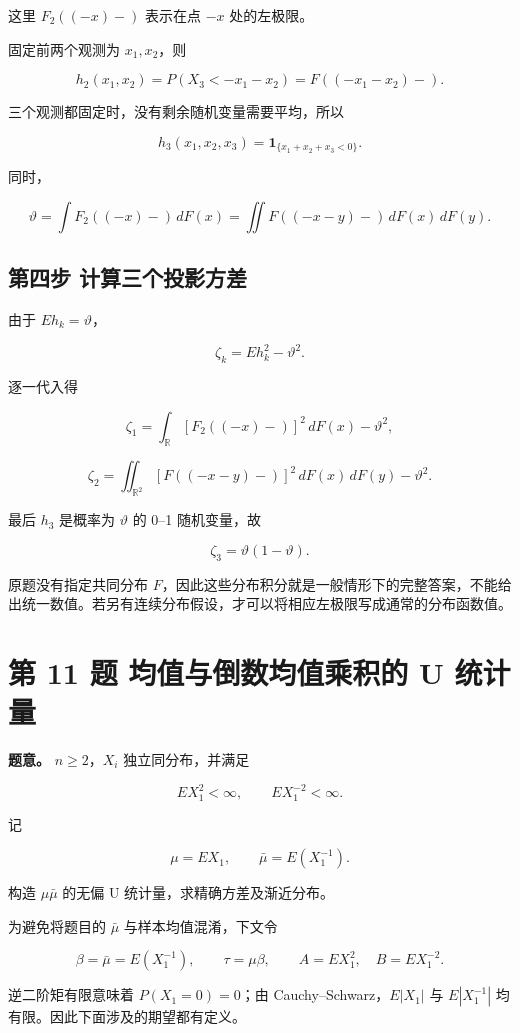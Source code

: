 这里 $F_2((-x)-)$ 表示在点 $-x$ 处的左极限。

固定前两个观测为 $x_1,x_2$，则

\[
h_2(x_1,x_2)
=P(X_3<-x_1-x_2)
=\boxed{F((-x_1-x_2)-)}.
\]

三个观测都固定时，没有剩余随机变量需要平均，所以

\[
\boxed{h_3(x_1,x_2,x_3)
=\mathbf1_{\{x_1+x_2+x_3<0\}}.}
\]

同时，

\[
\vartheta=\int F_2((-x)-)\,dF(x)
=\iint F((-x-y)-)\,dF(x)\,dF(y).
\]

\subsection{第四步 计算三个投影方差}

由于 $E h_k=\vartheta$，

\[
\zeta_k=E h_k^2-\vartheta^2.
\]

逐一代入得

\[
\boxed{
\zeta_1=\int_{\mathbb R}
[F_2((-x)-)]^2\,dF(x)-\vartheta^2,}
\]

\[
\boxed{
\zeta_2=\iint_{\mathbb R^2}
[F((-x-y)-)]^2\,dF(x)\,dF(y)-\vartheta^2.}
\]

最后 $h_3$ 是概率为 $\vartheta$ 的 0--1 随机变量，故

\[
\boxed{\zeta_3=\vartheta(1-\vartheta).}
\]

原题没有指定共同分布 $F$，因此这些分布积分就是一般情形下的完整答案，不能给出统一数值。若另有连续分布假设，才可以将相应左极限写成通常的分布函数值。

\section{第 11 题 均值与倒数均值乘积的 U 统计量}

\textbf{题意。} $n\ge2$，$X_i$ 独立同分布，并满足

\[
E X_1^2<\infty,\qquad E X_1^{-2}<\infty.
\]

记

\[
\mu=E X_1,\qquad \bar\mu=E(X_1^{-1}).
\]

构造 $\mu\bar\mu$ 的无偏 U 统计量，求精确方差及渐近分布。

为避免将题目的 $\bar\mu$ 与样本均值混淆，下文令

\[
\beta=\bar\mu=E(X_1^{-1}),\qquad
\tau=\mu\beta,\qquad
A=EX_1^2,\quad B=EX_1^{-2}.
\]

逆二阶矩有限意味着 $P(X_1=0)=0$；由 Cauchy--Schwarz，$E|X_1|$ 与 $E|X_1^{-1}|$ 均有限。因此下面涉及的期望都有定义。

